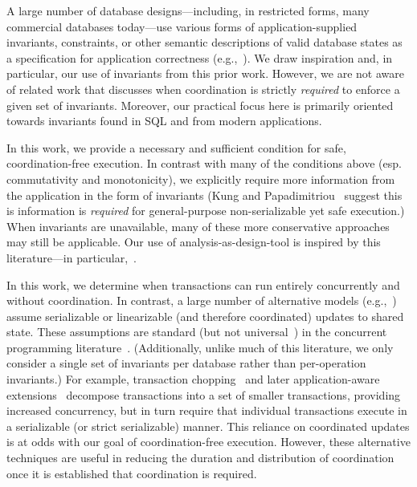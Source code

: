  A large number of database
designs---including, in restricted forms, many commercial databases
today---use various forms of application-supplied invariants,
constraints, or other semantic descriptions of valid database states
as a specification for application correctness
(e.g.,~\cite{korth-serializability,kemme-si-ic,garciamolina-semantics,ic-survey,ic-survey-two,decomp-semantics,redblue,writes-forest,davidson-survey,local-verification,redblue-new}). We
draw inspiration and, in particular, our use of invariants from this
prior work. However, we are not aware of related work that discusses
when coordination is strictly \textit{required} to enforce a given set
of invariants. Moreover, our practical focus here is primarily
oriented towards invariants found in SQL and from modern applications.

In this work, we provide a necessary and sufficient condition for
safe, coordination-free execution. In contrast with many of the
conditions above (esp. commutativity and monotonicity), we explicitly
require more information from the application in the form of
invariants (Kung and Papadimitriou~\cite{kung1979optimality} suggest
this is information is \textit{required} for general-purpose non-serializable
yet safe execution.)  When invariants are unavailable, many of these
more conservative approaches may still be applicable. Our use of
analysis-as-design-tool is inspired by this literature---in
particular,~\cite{kohler-commutativity}.

 In this work, we determine when
transactions can run entirely concurrently and without
coordination. In contrast, a large number of alternative models
(e.g.,~\cite{garciamolina-semantics,korth-serializability,isolation-semantics,local-verification,kemme-si-ic,aiken-confluence,laws-order})
assume serializable or linearizable (and therefore coordinated)
updates to shared state. These assumptions are standard (but not
universal~\cite{ec-txns}) in the concurrent programming
literature~\cite{schneider-concurrent,laws-order}. (Additionally,
unlike much of this literature, we only consider a single set of
invariants per database rather than per-operation invariants.) For
example, transaction chopping~\cite{chopping} and later
application-aware
extensions~\cite{decomp-semantics,agarwal-consistency} decompose
transactions into a set of smaller transactions, providing increased
concurrency, but in turn require that individual transactions execute
in a serializable (or strict serializable) manner.  This reliance on
coordinated updates is at odds with our goal of coordination-free
execution. However, these alternative techniques are useful in
reducing the duration and distribution of coordination once it is
established that coordination is required.

